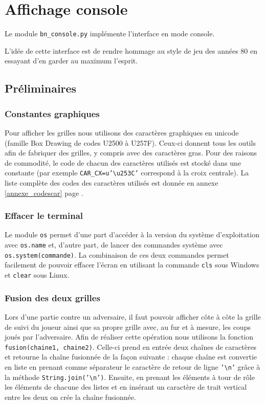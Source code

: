 \chapter{Affichage console}
Le module \texttt{bn\_console.py} implémente l'interface en mode console.

L'idée de cette interface est de rendre hommage au style de jeu des années 80 en essayant d'en garder au maximum l'esprit.

\section{Préliminaires}
\subsection{Constantes graphiques}
Pour afficher les grilles nous utilisons des caractères graphiques en unicode (famille Box Drawing de codes U2500 à U257F). Ceux-ci donnent tous les outils afin de fabriquer des grilles, y compris avec des caractères gras. Pour des raisons de commodité, le code de chacun des caractères utilisés est stocké dans une constante (par exemple \texttt{CAR\_CX=u'\textbackslash u253C'} correspond à la croix centrale). La liste complète des codes des caractères utilisés est donnée en annexe \ref{annexe_codescar} page \pageref{annexe_codescar}.

\subsection{Effacer le terminal}
Le module \texttt{os} permet d'une part d'accéder à la version du système d'exploitation avec \texttt{os.name} et, d'autre part, de lancer des commandes système avec \texttt{os.system(commande)}. La combinaison de ces deux commandes permet facilement de pouvoir effacer l'écran en utilisant la commande \texttt{cls} sous Windows et \texttt{clear} sous Linux.

\subsection{Fusion des deux grilles}
Lors d'une partie contre un adversaire, il faut pouvoir afficher côte à côte la grille de suivi du joueur ainsi que sa propre grille avec, au fur et à mesure, les coups joués par l'adversaire. Afin de réaliser cette opération nous utilisons la fonction \texttt{fusion(chaine1, chaine2)}. Celle-ci prend en entrée deux chaînes de caractères et retourne la chaîne fusionnée de la façon suivante : chaque chaîne est convertie en liste en prenant comme séparateur le caractère de retour de ligne \texttt{'\textbackslash n'} grâce à la méthode \texttt{String.join('\textbackslash n')}. Ensuite, en prenant les éléments à tour de rôle les éléments de chacune des listes et en insérant un caractère de trait vertical entre les deux on crée la chaîne fusionnée. 

